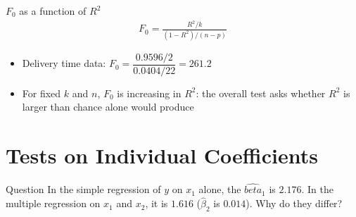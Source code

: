 \begin{frame}{$F_0$ as a function of $R^2$}
    \begin{align*}
        F_0 = \frac{R^2/k}{(1-R^2)/(n-p)}
    \end{align*}
    \begin{itemize}
        \item Delivery time data: $F_0 = \dfrac{0.9596/2}{0.0404/22} = 261.2$
        \item For fixed $k$ and $n$, $F_0$ is increasing in $R^2$: the overall test asks whether $R^2$ is larger than chance alone would produce
    \end{itemize}
\end{frame}





\section{Tests on Individual Coefficients}


\begin{frame}{Question}
    In the simple regression of $y$ on $x_1$ alone, the \(\hat{beta}_1\) is $2.176$. In the multiple regression on $x_1$ and $x_2$, it is $1.616$ ($\hat{\beta}_2$ is $0.014$). Why do they differ?
\end{frame}


